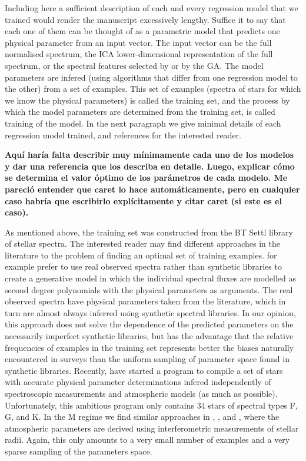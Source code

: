 Including here a sufficient description of each and every regression
model that we trained would render the manuscript excessively
lengthy. Suffice it to say that each one of them can be thought of as
a parametric model that predicts one physical parameter from an input
vector. The input vector can be the full normalised spectrum, the ICA
lower-dimensional representation of the full spectrum, or the spectral
features selected by \cite{cesetti} or by the GA. The model parameters
are infered (using algorithms that differ from one regression model to
the other) from a set of examples. This set of examples (spectra of
stars for which we know the physical parameters) is called the
training set, and the process by which the model parameters are
determined from the training set, is called training of the model. In
the next paragraph we give minimal details of each regression model
trained, and references for the interested reader.

{\bf Aquí haría falta describir muy mínimamente cada uno de los
modelos y dar una referencia que los describa en detalle. Luego,
explicar cómo se determina el valor óptimo de los parámetros de cada
modelo. Me pareció entender que caret lo hace automáticamente, pero en
cualquier caso habría que escribirlo explícitamente y citar caret (si
este es el caso).}

As mentioned above, the training set was constructed from the BT Settl
library of stellar spectra. The interested reader may find different
approaches in the literature to the problem of finding an optimal set
of training examples. \cite{hoggCannon} for example prefer to use real
observed spectra rather than synthetic libraries to create a
generative model in which the individual spectral fluxes are modelled
as second degree polynomials with the physical parameters as
arguments. The real observed spectra have physical parameters taken
from the literature, which in turn are almost always inferred using
synthetic spectral libraries. In our opinion, this approach does not
solve the dependence of the predicted parameters on the necessarily
imperfect synthetic libraries, but has the advantage that the relative
frequencies of examples in the training set represents better the
biases naturally encountered in surveys than the uniform sampling of
parameter space found in synthetic libraries. Recently, \cite{heiter}
have started a program to compile a set of stars with accurate
physical parameter determinations infered independently of
spectroscopic measurements and atmospheric models (as much as
possible). Unfortunately, this ambitious program only contains 34
stars of spectral types F, G, and K. In the M regime we find similar
approaches in \cite{dummy}, \cite{dummy}, and \cite{dummy}, where the
atmospheric parameters are derived using interferometric measurements
of stellar radii. Again, this only amounts to a very small number of
examples and a very sparse sampling of the parameters space.

